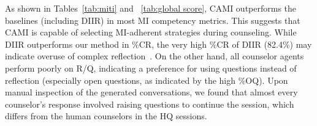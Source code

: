 \begin{table}[tb]
\caption{Results of the MI global score evaluation. Our method outperforms others in all four scores. Note that ``Cultivate'', ``Soften'' and ``Partner'' are abbreviations for Cultivating Change Talk, Softening Sustain Talk, and Partnership respectively. }
\label{tab:global score}
\end{table}

As shown in Tables~\ref{tab:miti} and ~\ref{tab:global score}, CAMI outperforms the baselines (including DIIR) in most MI competency metrics. This suggests that CAMI is capable of selecting MI-adherent strategies during counseling. While DIIR outperforms our method in \%CR, the very high \%CR of DIIR (82.4\%) may indicate overuse of complex reflection~\citep{steenstra2024virtual}. On the other hand, all counselor agents perform poorly on R/Q, indicating a preference for using questions instead of reflection (especially open questions, as indicated by the high \%OQ). Upon manual inspection of the generated conversations, we found that almost every counselor's response involved raising questions to continue the session, which differs from the human counselors in the HQ sessions.

